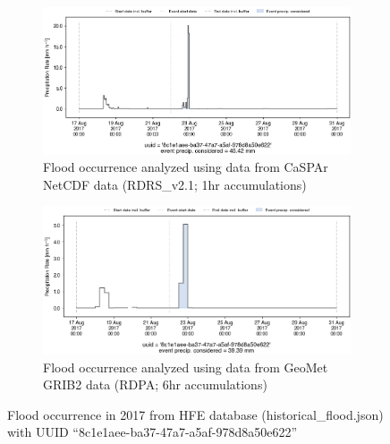 \documentclass[10pt,a4paper,titlepage,parskip]{scrartcl}
\begin{document}
\begin{figure}[h]
	\begin{subfigure}[a]{1.0\textwidth}
		\centering
		\includegraphics[width=\linewidth]{figures/compare_Geomet_CaSPAr/interpolated_at_stations_occurrence_1157_identified-timesteps_RDRS_v2.1.png}
		\caption{Flood occurrence analyzed using data from CaSPAr NetCDF data (RDRS\_v2.1; 1hr accumulations)}
	\end{subfigure}
	\par\bigskip\bigskip
	\begin{subfigure}[b]{1.0\textwidth}
		\centering
		\includegraphics[width=\linewidth]{figures/compare_Geomet_CaSPAr/interpolated_at_stations_occurrence_1157_identified-timesteps_rdpa:10km:6f.png}
		\caption{Flood occurrence analyzed using data from GeoMet GRIB2 data (RDPA; 6hr accumulations)}
	\end{subfigure}
	\par\bigskip\bigskip
	\caption{Flood occurrence in 2017 from HFE database (historical\_flood.json) with UUID ``8c1e1aee-ba37-47a7-a5af-978d8a50e622''}
\end{figure}
\pagebreak
\end{document}
